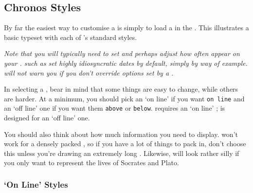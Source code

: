 \documentclass[10pt,british,a4paper]{ltxdoc}
\newcommand*\pkg[1]{\textpkg{#1}}
\begin{document}
\subsection{Chronos Styles}\label{subsec:chronos-styles}

By far the easiest way to customise a  is simply to load a  in the .
This  illustrates a basic  typeset with each of \pkg{chronos}'s standard styles.

\emph{Note that you will typically need to set  and perhaps adjust how often  appear on your .
  \Chronosstyleslabelname{} such as  set highly idiosyncratic dates by default, simply by way of example.
  \pkg{chronos} will not warn you if you don't override options set by a \chronosstylelabelname{}.}

In selecting a \chronosstylelabelname{}, bear in mind that some things are easy to change, while others are harder.
At a minimum, you should pick an ‘on line’ \chronosstylelabelname{} if you want  \texttt{on line} and an ‘off line’ one if you want them \texttt{above} or \texttt{below}.
 requires an ‘on line’ \chronosstylelabelname;  is designed for an ‘off line’ one.

You should also think about how much information you need to display.
 won't work for a densely packed , so if you have a lot of things to pack in, don't choose this unless you're drawing an extremely long .
Likewise,  will look rather silly if you only want to represent the lives of Socrates and Plato.

\subsubsection{‘On Line’ Styles}\label{subsubsec:chronos-styles-on-line}
\end{document}
